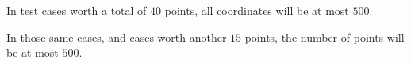 In test cases worth a total of $40$ points, all coordinates will be at most $500$.

In those same cases, and cases worth another $15$ points, the number of points will be at most $500$.

